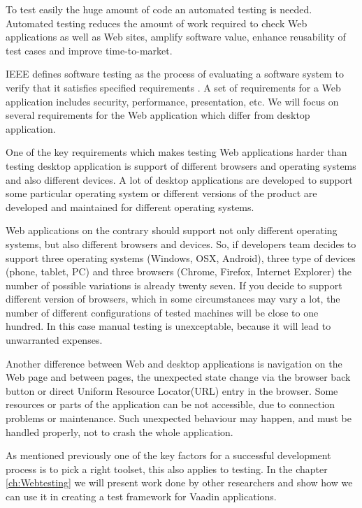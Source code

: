 	 	 To test easily the huge amount of code an automated testing is needed.	
	 	 Automated testing reduces the amount of work required to check Web applications as
	 	 well as Web sites, amplify software value, enhance reusability of test cases and improve time-to-market.
	   
		IEEE defines software testing as the process of evaluating a software
		system to verify that it satisfies specified requirements \cite{Xu1}. A set of
		requirements for a Web application includes security, performance,
		presentation, etc. We will focus on several requirements for the Web
		application which differ from desktop application. 
		
		One of the key requirements which makes testing Web applications harder than
		testing desktop application is support of different browsers and operating systems and also
		different devices. A lot of desktop applications are developed to support some
		particular operating system or different versions of the product are developed
		and maintained for different operating systems. 
		
		Web applications on the	contrary should support not only different operating systems, but also
		different browsers and devices. So, if developers team decides to support
		three operating systems (Windows, OSX, Android), three type of devices (phone,
		tablet, PC) and three browsers (Chrome, Firefox, Internet Explorer) the number
		of possible variations is already twenty seven. If you decide to support
		different version of browsers, which in some circumstances may vary a lot,
		the number of different configurations of tested machines will be close to
		one hundred. In this case manual testing is unexceptable, because it will lead
		to unwarranted expenses. 
		
		Another difference between Web and desktop applications is
		navigation on the Web page and between pages, the unexpected state change via
		the browser back button or direct Uniform Resource Locator(URL) entry in the
		browser. Some resources or parts of the application can be not
		accessible, due to connection problems or maintenance. Such unexpected
		behaviour may happen, and must be handled properly, not to crash the whole application.

    As mentioned previously one of the key factors for a successful
    development process is to pick a right toolset, this also applies to
    testing. In the chapter \ref{ch:Webtesting} we will present work done by
    other researchers and show how we can use it in creating a test framework
    for Vaadin applications.
      
